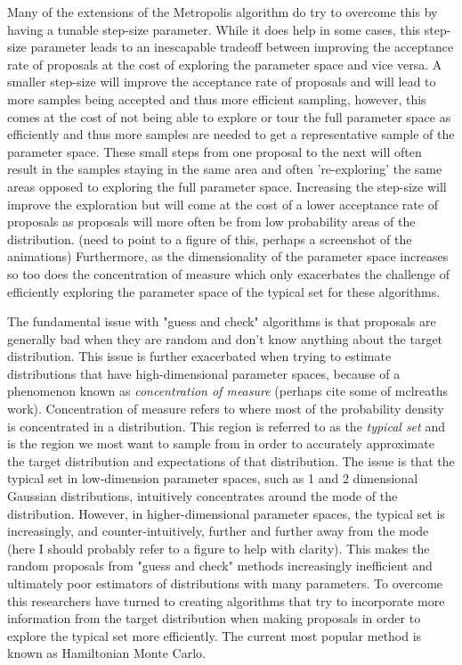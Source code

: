 Many of the extensions of the Metropolis algorithm do try to overcome this by having a tunable step-size parameter. While it does help in some cases, this step-size parameter leads to an inescapable tradeoff between improving the acceptance rate of proposals at the cost of exploring the parameter space and vice versa. A smaller step-size will improve the acceptance rate of proposals and will lead to more samples being accepted and thus more efficient sampling, however, this comes at the cost of not being able to explore or tour the full parameter space as efficiently and thus more samples are needed to get a representative sample of the parameter space. These small steps from one proposal to the next will often result in the samples staying in the same area and often 're-exploring' the same areas opposed to exploring the full parameter space. Increasing the step-size will improve the exploration but will come at the cost of a lower acceptance rate of proposals as proposals will more often be from low probability areas of the distribution. (need to point to a figure of this, perhaps a screenshot of the animations) Furthermore, as the dimensionality of the parameter space increases so too does the concentration of measure which only exacerbates the challenge of efficiently exploring the parameter space of the typical set for these algorithms.

The fundamental issue with "guess and check" algorithms is that proposals are generally bad when they are random and don't know anything about the target distribution. This issue is further exacerbated when trying to estimate distributions that have high-dimensional parameter spaces, because of a phenomenon known as \textit{concentration of measure} (perhaps cite some of mclreaths work). Concentration of measure refers to where most of the probability density is concentrated in a distribution. This region is referred to as the \textit{typical set} and is the region we most want to sample from in order to accurately approximate the target distribution and expectations of that distribution. The issue is that the typical set in low-dimension parameter spaces, such as 1 and 2 dimensional Gaussian distributions, intuitively concentrates around the mode of the distribution. However, in higher-dimensional parameter spaces, the typical set is increasingly, and counter-intuitively, further and further away from the mode (here I should probably refer to a figure to help with clarity). This makes the random proposals from "guess and check" methods increasingly inefficient and ultimately poor estimators of distributions with many parameters. To overcome this researchers have turned to creating algorithms that try to incorporate more information from the target distribution when making proposals in order to explore the typical set more efficiently. The current most popular method is known as Hamiltonian Monte Carlo.

